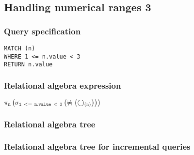 \subsection{Handling numerical ranges 3}

\subsubsection*{Query specification}

\begin{lstlisting}
MATCH (n)
WHERE 1 <= n.value < 3
RETURN n.value
\end{lstlisting}

\subsubsection*{Relational algebra expression}

$\projection{\var{n}} \left(\selection{\mathtt{1~<=~n.value~<~3}} \left(\alldifferent{} \left(\getvertices{n}{}\right)\right)\right)$

\subsubsection*{Relational algebra tree}


\subsubsection*{Relational algebra tree for incremental queries}


